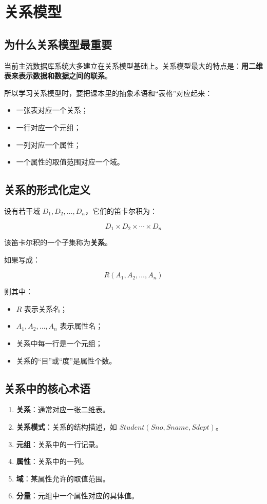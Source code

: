 \documentclass{../../note}
\begin{document}
\section{关系模型}

\subsection{为什么关系模型最重要}

当前主流数据库系统大多建立在关系模型基础上。关系模型最大的特点是：\textbf{用二维表来表示数据和数据之间的联系}。

所以学习关系模型时，要把课本里的抽象术语和“表格”对应起来：

\begin{itemize}
  \item 一张表对应一个关系；
  \item 一行对应一个元组；
  \item 一列对应一个属性；
  \item 一个属性的取值范围对应一个域。
\end{itemize}

\subsection{关系的形式化定义}

设有若干域 $D_1, D_2, \dots, D_n$，它们的笛卡尔积为：

\[
D_1 \times D_2 \times \cdots \times D_n
\]

该笛卡尔积的一个子集称为\textbf{关系}。

如果写成：

\[
R(A_1, A_2, \dots, A_n)
\]

则其中：

\begin{itemize}
  \item $R$ 表示关系名；
  \item $A_1, A_2, \dots, A_n$ 表示属性名；
  \item 关系中每一行是一个元组；
  \item 关系的“目”或“度”是属性个数。
\end{itemize}

\subsection{关系中的核心术语}

\begin{enumerate}
  \item \textbf{关系}：通常对应一张二维表。
  \item \textbf{关系模式}：关系的结构描述，如 $Student(Sno, Sname, Sdept)$。
  \item \textbf{元组}：关系中的一行记录。
  \item \textbf{属性}：关系中的一列。
  \item \textbf{域}：某属性允许的取值范围。
  \item \textbf{分量}：元组中一个属性对应的具体值。
\end{enumerate}
\end{document}
